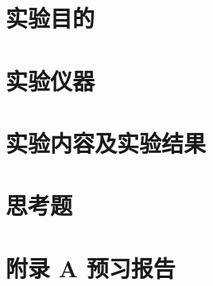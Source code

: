 \documentclass[UTF8]{article}
\begin{document}

\section{实验目的}



\section{实验仪器}

\section{实验内容及实验结果}

\section{思考题}





















































\newpage
\section*{附录 A\hspace*{20pt} 预习报告}
\thispagestyle{fancy} 
\begin{figure}[H]\centering
\end{figure}
%
\end{document}
